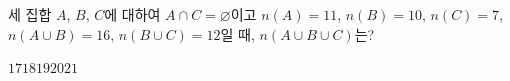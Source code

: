 세 집합 $A$, $B$, $C$에 대하여 $A\cap C=\varnothing$이고 $n(A)=11$, $n(B)=10$, $n(C)=7$, $n(A\cup B)=16$, $n(B\cup C)=12$일 때, $n(A\cup B\cup C)$는?
\begin{choices32}{$17$}{$18$}{$19$}{$20$}{$21$}\end{choices32}

